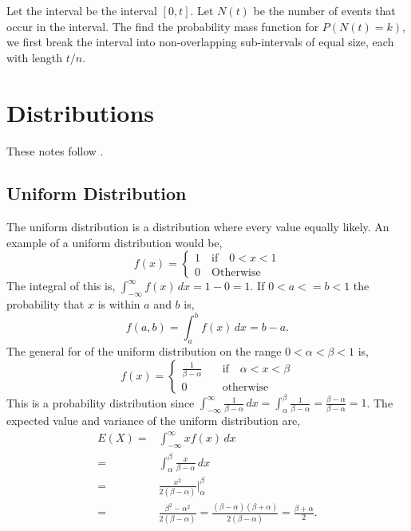 \documentclass{article}
\begin{document}
Let the interval be the interval $[0, t]$. Let $N(t)$ be the number of events that occur in the interval. The find the probability mass function for $P(N(t) = k)$, we first break the interval into non-overlapping sub-intervals of equal size, each with length $t / n$.
\section{Distributions}

These notes follow \cite{ross98}.

\subsection{Uniform Distribution}

The uniform distribution is a distribution where every value equally likely. An example of a uniform distribution would be,
\begin{equation}
    f(x) =
    \begin{cases}
        1 \quad \text{if} \quad 0 < x < 1 \\
        0 \quad \text{Otherwise}
    \end{cases}
\end{equation}
The integral of this is, $\int_{-\infty}^{\infty} f(x) \, dx = 1 - 0 = 1$. If $0 < a <= b < 1$ the probability that $x$ is within $a$ and $b$ is,
\begin{equation*}
    f(a, b) = \int_{a}^{b} f(x) \, dx = b - a.
\end{equation*}
The general for of the uniform distribution on the range $0 < \alpha < \beta < 1$ is,
\begin{equation}
    f(x) =
    \begin{cases}
        \frac{1}{\beta - \alpha} \quad & \text{if} \quad \alpha < x < \beta \\
        0 \quad & \text{otherwise}
    \end{cases}
\end{equation}
This is a probability distribution since $\int_{-\infty}^{\infty} \frac{1}{\beta - \alpha} \, dx = \int_{\alpha}^{\beta} \frac{1}{\beta - \alpha} = \frac{\beta - \alpha}{\beta - \alpha} = 1$. The expected value and variance of the uniform distribution are,
\begin{align*}
    E(X) = & \int_{-\infty}^{\infty} x f(x) \, dx \\
         = & \int_{\alpha}^{\beta} \frac{x}{\beta - \alpha} \, dx \\
         = & \frac{x^2}{2(\beta - \alpha)} \Bigr|^{\beta}_{\alpha} \\
         = & \frac{\beta^2 - \alpha^2}{2(\beta - \alpha)} = \frac{(\beta - \alpha)(\beta + \alpha)}{2(\beta - \alpha)} = \frac{\beta + \alpha}{2}.
\end{align*}
\end{document}
